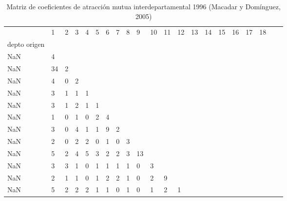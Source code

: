 \begin{table}
\centering
\caption{Matriz de coeficientes de atracción mutua interdepartamental 1996 (Macadar y Domínguez, 2005)}
\begin{tabular}{lp{0.25cm}p{0.25cm}p{0.25cm}p{0.25cm}p{0.25cm}p{0.25cm}p{0.25cm}p{0.25cm}p{0.25cm}p{0.25cm}p{0.25cm}p{0.25cm}p{0.25cm}p{0.25cm}p{0.25cm}p{0.25cm}p{0.25cm}p{0.25cm}p{0.25cm}p{0.25cm}}
\toprule
{} &   1 &  2 &  3 &  4 &  5 &  6 &  7 &  8 &  9 &  10 &  11 &  12 &  13 &  14 &  15 &  16 &  17 &  18 \\
depto origen &     &    &    &    &    &    &    &    &    &     &     &     &     &     &     &     &     &     \\
\midrule
NaN          &   4 &    &    &    &    &    &    &    &    &     &     &     &     &     &     &     &     &     \\
NaN          &  34 &  2 &    &    &    &    &    &    &    &     &     &     &     &     &     &     &     &     \\
NaN          &   4 &  0 &  2 &    &    &    &    &    &    &     &     &     &     &     &     &     &     &     \\
NaN          &   3 &  1 &  1 &  1 &    &    &    &    &    &     &     &     &     &     &     &     &     &     \\
NaN          &   3 &  1 &  2 &  1 &  1 &    &    &    &    &     &     &     &     &     &     &     &     &     \\
NaN          &   1 &  0 &  1 &  0 &  2 &  4 &    &    &    &     &     &     &     &     &     &     &     &     \\
NaN          &   3 &  0 &  4 &  1 &  1 &  9 &  2 &    &    &     &     &     &     &     &     &     &     &     \\
NaN          &   2 &  0 &  2 &  2 &  0 &  1 &  0 &  3 &    &     &     &     &     &     &     &     &     &     \\
NaN          &   5 &  2 &  4 &  5 &  3 &  2 &  2 &  3 & 13 &     &     &     &     &     &     &     &     &     \\
NaN          &   3 &  3 &  1 &  0 &  1 &  1 &  1 &  1 &  0 &   3 &     &     &     &     &     &     &     &     \\
NaN          &   2 &  1 &  1 &  0 &  1 &  2 &  2 &  1 &  0 &   2 &   9 &     &     &     &     &     &     &     \\
NaN          &   5 &  2 &  2 &  2 &  1 &  1 &  0 &  1 &  0 &   1 &   2 &   1 &     &     &     &     &     &     \\

\end{tabular}
\end{table}

